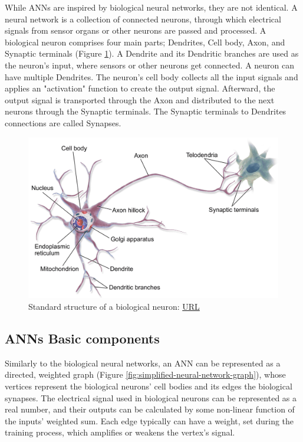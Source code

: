 While ANNs are inspired by biological neural networks, they are not identical. A neural network is a collection of connected neurons, through which electrical signals from sensor organs or other neurons are passed and processed. A biological neuron comprises four main parts; Dendrites, Cell body, Axon, and Synaptic terminals (Figure \ref{fig:Standard-structure-of-a-biological-neuron}). A Dendrite and its Dendritic branches are used as the neuron's input, where sensors or other neurons get connected. A neuron can have multiple Dendrites. The neuron's cell body collects all the input signals and applies an "activation" function to create the output signal. Afterward, the output signal is transported through the Axon and distributed to the next neurons through the Synaptic terminals. The Synaptic terminals to Dendrites connections are called Synapses.

\begin{figure} [H]
	\centering
	\includegraphics[scale=0.25]{Images/Biological-Neuron.png}
	\decoRule
	\caption[Standard structure of a biological neuron]{Standard structure of a biological neuron: \href{https://nurseslabs.com/nervous-system/}{URL}}
	\label{fig:Standard-structure-of-a-biological-neuron}
\end{figure}

\subsection{ANNs Basic components} \label{subsection:ANNs-Basic-components}
Similarly to the biological neural networks, an ANN can be represented as a directed, weighted graph (Figure \ref{fig:simplified-neural-network-graph}), whose vertices represent the biological neurons' cell bodies and its edges the biological synapses. The electrical signal used in biological neurons can be represented as a real number, and their outputs can be calculated by some non-linear function of the inputs' weighted sum. Each edge typically can have a weight, set during the training process, which amplifies or weakens the vertex's signal.

